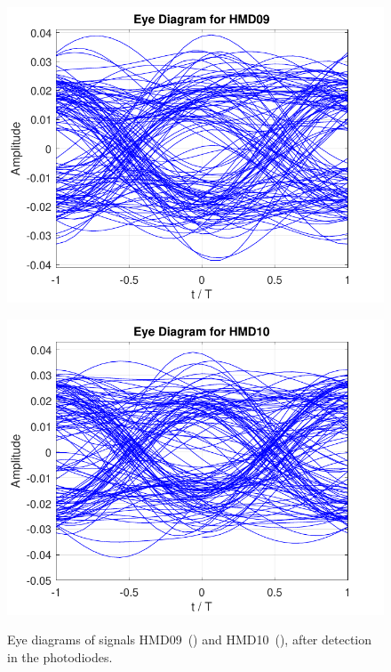 \begin{figure}[H]
	\centering
	\begin{minipage}{0.45\textwidth}
		\centering
		\includegraphics[width=1\textwidth]		
		{./sdf/m_qam_system/figures/simulations/03_eNoise/HMD09_ed.pdf}
		\subcaption{}\label{fig:sim_eNoiseHmd09ed}
	\end{minipage}
	\begin{minipage}{0.45\textwidth}
		\centering
		\includegraphics[width=1\textwidth]
		{sdf/m_qam_system/figures/simulations/03_eNoise/HMD10_ed.pdf}
		\subcaption{}\label{fig:sim_eNoiseHmd10ed}
	\end{minipage}
	\caption{Eye diagrams of signals HMD09~() and 
		HMD10~(), after detection in the 
		photodiodes.}\label{fig:sim_eNoiseHmd0910ed}
\end{figure}

